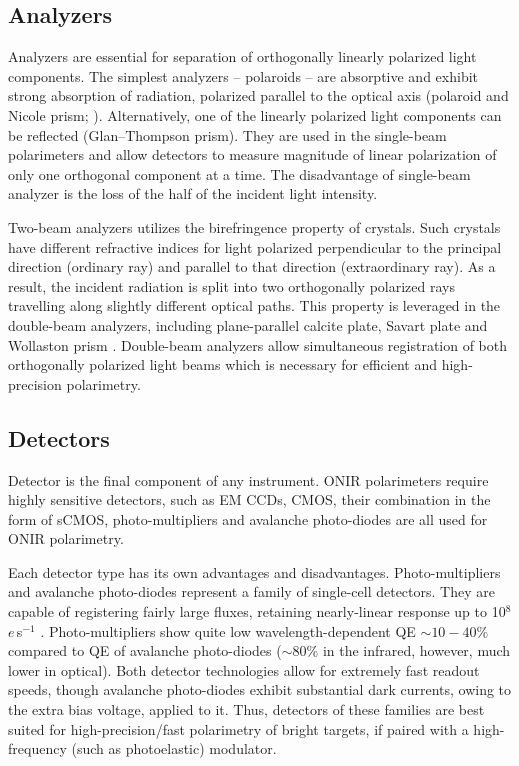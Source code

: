 \subsection{Analyzers}
Analyzers are essential for separation of orthogonally linearly polarized light components.
The simplest analyzers -- polaroids -- are absorptive and exhibit strong absorption of radiation, polarized parallel to the optical axis (polaroid and Nicole prism; \citealt{AstronomicalPolarimetry}).
Alternatively, one of the linearly polarized light components can be reflected (Glan--Thompson prism).
They are used in the single-beam polarimeters and allow detectors to measure magnitude of linear polarization of only one orthogonal component at a time.
The disadvantage of single-beam analyzer is the loss of the half of the incident light intensity.

Two-beam analyzers utilizes the birefringence property of crystals.
Such crystals have different refractive indices for light polarized perpendicular to the principal direction (ordinary ray) and parallel to that direction (extraordinary ray).
As a result, the incident radiation is split into two orthogonally polarized rays travelling along slightly different optical paths.
This property is leveraged in the double-beam analyzers, including plane-parallel calcite plate, Savart plate and Wollaston prism \citep[e.g.,][]{Serkowski1974, AstronomicalPolarimetry,Berdyugin2019}.
Double-beam analyzers allow simultaneous registration of both orthogonally polarized light beams which is necessary for efficient and high-precision polarimetry.

\subsection{Detectors}
\label{sec:pol:detectors}
Detector is the final component of any instrument.
\gls{ONIR} polarimeters require highly sensitive detectors, such as \gls{EM} \glspl{CCD}, \gls{CMOS}, their combination in the form of \gls{sCMOS}, photo-multipliers and avalanche photo-diodes are all used for \gls{ONIR} polarimetry.

Each detector type has its own advantages and disadvantages. 
Photo-multipliers and avalanche photo-diodes represent a family of single-cell detectors.
They are capable of registering fairly large fluxes, retaining nearly-linear response up to 10$^8$ $e\,$s$^{-1}$ \citep{Berdyugin2019}.
Photo-multipliers show quite low wavelength-dependent \gls{QE} $\sim 10-40\%$ compared to \gls{QE} of avalanche photo-diodes ($\sim 80\%$ in the infrared, however, much lower in optical).
Both detector technologies allow for extremely fast readout speeds, though avalanche photo-diodes exhibit substantial dark currents, owing to the extra bias voltage, applied to it.
Thus, detectors of these families are best suited for high-precision/fast polarimetry of bright targets, if paired with a high-frequency (such as photoelastic) modulator.


